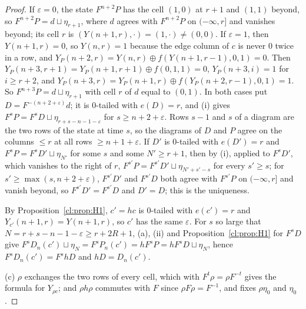 \begin{proof}
If $\varepsilon=0$, the state $F^{n+2}P$ has the cell $(1,0)$ at $r+1$ and $(1,1)$ beyond, so $F^{n+2}P=d\sqcup\eta_{r+1}$, where $d$ agrees with $F^{n+2}P$ on $(-\infty,r]$ and vanishes beyond; its cell $r$ is $(Y(n+1,r),\cdot)=(1,\cdot)\ne(0,0)$. If $\varepsilon=1$, then $Y(n+1,r)=0$, so $Y(n,r)=1$ because the edge column of $c$ is never $0$ twice in a row, and $Y_P(n+2,r)=Y(n,r)\oplus f(Y(n+1,r-1),0,1)=0$. Then $Y_P(n+3,r+1)=Y_P(n+1,r+1)\oplus f(0,1,1)=0$, $Y_P(n+3,i)=1$ for $i\ge r+2$, and $Y_P(n+3,r)=Y_P(n+1,r)\oplus f(Y_P(n+2,r-1),0,1)=1$. So $F^{n+3}P=d\sqcup\eta_{r+1}$ with cell $r$ of $d$ equal to $(0,1)$. In both cases put $D=F^{-(n+2+\varepsilon)}d$; it is $0$-tailed with $e(D)=r$, and (i) gives $F^sP=F^sD\sqcup\eta_{r+s-n-1-\varepsilon}$ for $s\ge n+2+\varepsilon$. Rows $s-1$ and $s$ of a diagram are the two rows of the state at time $s$, so the diagrams of $D$ and $P$ agree on the columns $\le r$ at all rows $\ge n+1+\varepsilon$. If $D'$ is $0$-tailed with $e(D')=r$ and $F^sP=F^sD'\sqcup\eta_{N'}$ for some $s$ and some $N'\ge r+1$, then by (i), applied to $F^sD'$, which vanishes to the right of $r$, $F^{s'}P=F^{s'}D'\sqcup\eta_{N'+s'-s}$ for every $s'\ge s$; for $s'\ge\max(s,n+2+\varepsilon)$, $F^{s'}D'$ and $F^{s'}D$ both agree with $F^{s'}P$ on $(-\infty,r]$ and vanish beyond, so $F^{s'}D'=F^{s'}D$ and $D'=D$; this is the uniqueness.

By Proposition~\ref{cl:prop:H1}, $c'=hc$ is $0$-tailed with $e(c')=r$ and $Y_{c'}(n+1,r)=Y(n+1,r)$, so $c'$ has the same $\varepsilon$. For $s$ so large that $N=r+s-n-1-\varepsilon\ge r+2R+1$, (a), (ii) and Proposition~\ref{cl:prop:H1} for $F^sD$ give $F^sD_n(c')\sqcup\eta_N=F^sP_n(c')=hF^sP=hF^sD\sqcup\eta_N$, hence $F^sD_n(c')=F^shD$ and $hD=D_n(c')$.

(c) $\rho$ exchanges the two rows of every cell, which with $F^t\rho=\rho F^{-t}$ gives the formula for $Y_{\rho c}$; and $\rho h\rho$ commutes with $F$ since $\rho F\rho=F^{-1}$, and fixes $\rho\eta_0$ and $\eta_0$.
\end{proof}


